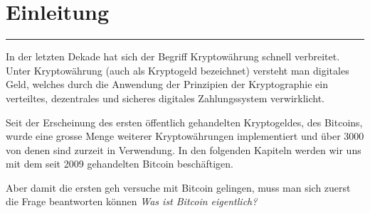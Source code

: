 \vspace*{1mm}
\section*{Einleitung}
\vspace{-10mm}
\noindent\rule{0.8\textwidth}{0.4pt}

\vspace{5mm}

\noindent
In der letzten Dekade hat sich der Begriff Kryptowährung schnell verbreitet. Unter Kryptowährung
(auch als Kryptogeld bezeichnet) versteht man digitales Geld, welches durch die Anwendung
der Prinzipien der Kryptographie ein verteiltes, dezentrales und sicheres digitales Zahlungssystem
verwirklicht.

\noindent
Seit der Erscheinung des ersten öffentlich gehandelten Kryptogeldes, des Bitcoins, wurde eine grosse
Menge weiterer Kryptowährungen implementiert und über 3000 von denen sind zurzeit in Verwendung. In
den folgenden Kapiteln werden wir uns mit dem seit 2009 gehandelten Bitcoin beschäftigen.

\noindent
Aber damit die ersten geh versuche mit Bitcoin gelingen, muss man sich zuerst die Frage beantworten
können \emph{\dq Was ist Bitcoin eigentlich?\dq}


\newpage

